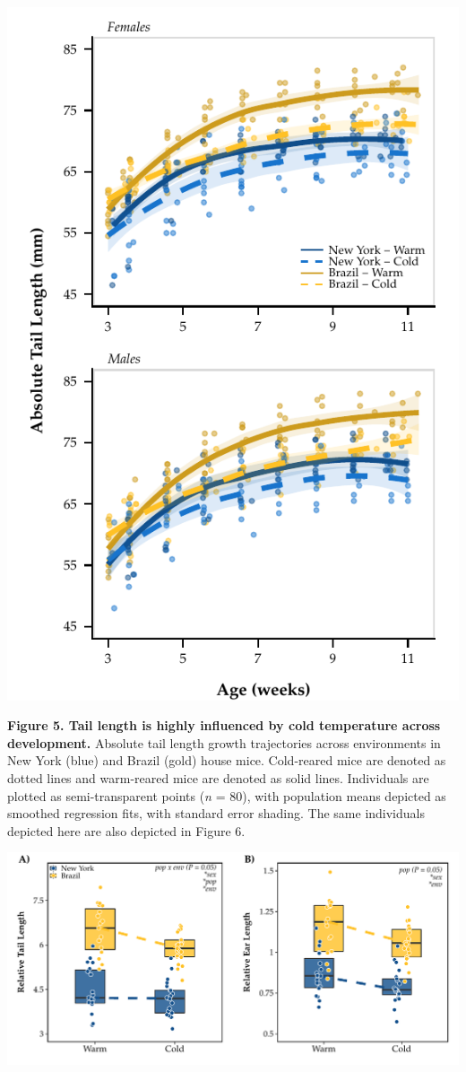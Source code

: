 \documentclass[]{article}
\begin{document}
\includegraphics{../results/figures/Weekly_Tails.pdf}

\textbf{Figure 5. Tail length is highly influenced by cold temperature
across development.} Absolute tail length growth trajectories across
environments in New York (blue) and Brazil (gold) house mice.
Cold-reared mice are denoted as dotted lines and warm-reared mice are
denoted as solid lines. Individuals are plotted as semi-transparent
points (\emph{n} = 80), with population means depicted as smoothed
regression fits, with standard error shading. The same individuals
depicted here are also depicted in Figure 6.

\newpage

\includegraphics{../results/figures/RXNs_Extremities_relative.pdf}
\end{document}
